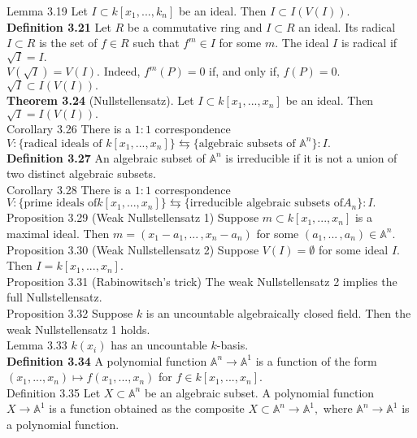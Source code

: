 \documentclass[8pt]{extarticle}
\begin{document}
Lemma 3.19 Let $I\subset k[x_1,...,k_n]$ be an ideal. Then $I\subset I(V(I)).$\\
\textbf{Definition 3.21} Let $R$ be a commutative ring and $I\subset R$ an ideal. Its radical $I\subset R$ is the set of $f\in R$ such that $f^m\in I$ for some $m.$ The ideal $I$ is radical if $\sqrt{I}=I.$\\
$V(\sqrt{I})=V(I).$ Indeed, $f^m(P)=0$ if, and only if, $f(P)=0.$\\
$\sqrt{I}\subset I(V(I)).$\\
\textbf{Theorem 3.24} (Nullstellensatz). Let $I \subset k[x_1,..., x_n]$ be an ideal. Then $\sqrt{I}=I(V(I)).$\\
Corollary 3.26 There is a $1:1$ correspondence $V: \{\text{radical ideals of} \,\,k[x_1,...,x_n]\}\leftrightarrows \{\text{algebraic subsets of}\,\,\mathbb{A}^n\} :I.$\\
\textbf{Definition 3.27} An algebraic subset of $\mathbb{A}^n$ is irreducible if it is not a union of two distinct algebraic subsets.\\
Corollary 3.28 There is a $1:1$ correspondence $V: \{\text{prime ideals of} k[x_1,...,x_n]\} \leftrightarrows \{\text{irreducible algebraic subsets of} A_n\} :I.$\\
Proposition 3.29 (Weak Nullstellensatz 1) Suppose $m \subset k[x_1,..., x_n]$ is a maximal ideal. Then $m = (x_1-a_1,...\,, x_n-a_n)$ for some $(a_1,...\,,a_n)\in \mathbb{A}^n.$\\
Proposition 3.30 (Weak Nullstellensatz 2) Suppose $V(I) = \emptyset$ for some ideal $I.$ Then $I = k[x_1,..., x_n].$\\
Proposition 3.31 (Rabinowitsch’s trick) The weak Nullstellensatz 2 implies the full Nullstellensatz.\\
Proposition 3.32 Suppose $k$ is an uncountable algebraically closed field. Then the weak Nullstellensatz 1 holds.\\
Lemma 3.33 $k(x_i)$ has an uncountable $k$-basis.\\
\textbf{Definition 3.34} A polynomial function $\mathbb{A}^n \rightarrow \mathbb{A}^1$ is a function of the form $(x_1, . . . , x_n)\mapsto f(x_1, ..., x_n)$
for $f \in k[x_1,...,x_n].$\\
Definition 3.35 Let $X \subset \mathbb{A}^n$ be an algebraic subset. A polynomial function $X \rightarrow \mathbb{A}^1$ is a function obtained as the composite $X \subset \mathbb{A}^n \rightarrow \mathbb{A}^1,$ where $\mathbb{A}^n \rightarrow \mathbb{A}^1$ is a polynomial function.\\
\end{document}
